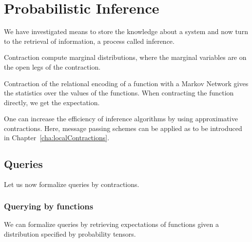 \section{Probabilistic Inference}\label{cha:probReasoning} 

We have investigated means to store the knowledge about a system and now turn to the retrieval of information, a process called inference.


\begin{remark}
	Contraction compute marginal distributions, where the marginal variables are on the open legs of the contraction.
\end{remark}

% 
Contraction of the relational encoding of a function with a Markov Network gives the statistics over the values of the functions.
When contracting the function directly, we get the expectation.

One can increase the efficiency of inference algorithms by using approximative contractions.
Here, message passing schemes can be applied as to be introduced in Chapter~\ref{cha:localContractions}.

\subsection{Queries}

Let us now formalize queries by contractions.

\subsubsection{Querying by functions}

We can formalize queries by retrieving expectations of functions given a distribution specified by probability tensors. 

